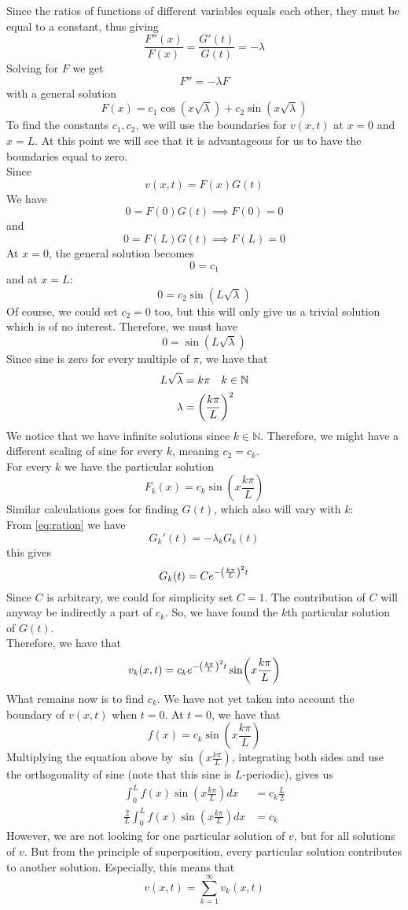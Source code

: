 \documentclass[12pt,english,a4paper]{article}
\begin{document}
Since the ratios of functions of different variables equals each other, they must be equal to a constant, thus giving
\[
\frac{F''(x)}{F(x)} = \frac{G'(t)}{G(t)} = -\lambda
\]
Solving for \(F\) we get
\[
	F'' = -\lambda F
\]
with a general solution
\[
F(x) = c_1\cos(x\sqrt{\lambda} ) + c_2\sin(x\sqrt{\lambda})
\]
To find the constants \(c_1,c_2\), we will use the boundaries for \(v(x,t)\) at \(x = 0\) and \(x = L\). At this point we will see that it is advantageous for us to have the boundaries equal to zero.\\
Since
\[
v(x,t) = F(x)G(t)
\]
We have
\[
0 = F(0)G(t) \implies F(0) = 0
\]
and
\[
0 = F(L)G(t) \implies F(L) = 0
\]
At \(x = 0\), the general solution becomes
\[
0 = c_1
\]
and at \(x = L\):
\[
0 =  c_2\sin(L\sqrt{\lambda})
\]
Of course, we could set \(c_2 = 0\) too, but this will only give us a trivial solution which is of no interest. Therefore, we must have
\[
0 = \sin(L\sqrt{\lambda})
\]
Since sine is zero for every multiple of \(\pi\), we have that
\begin{align*}
L\sqrt{\lambda} &= k\pi \quad k\in \mathbb{N}\\
\lambda &= \qty(\frac{k \pi}{L})^2
\end{align*}
We notice that we have infinite solutions since \(k \in \mathbb{N}\). Therefore, we might have a different scaling of sine for every \(k\), meaning \(c_2 = c_k\).\\  For every \(k\) we have the particular solution
\[
F_k(x) = c_k\sin(x\frac{k \pi}{L})
\]
Similar calculations goes for finding \(G(t)\), which also will vary with \(k\):\\
From \vref{eq:ration} we have
\[
G_k'(t) = -\lambda_k G_k(t)
\]
this gives
\[
G_k(t) = Ce^{-\qty(\frac{k \pi}{L})^2t}
\]
Since \(C\) is arbitrary, we could for simplicity set \( C = 1\). The contribution of \(C\) will anyway be indirectly a part of  \(c_k\). 
So, we have found the \(k\)th particular solution of \(G(t)\). \\
Therefore, we have that
\[
v_k(x,t) = c_ke^{-\qty(\frac{k \pi}{L})^2t}\sin(x\frac{k \pi}{L})
\]
What remains now is to find \(c_k\). We have not yet taken into account the boundary of \(v(x,t)\) when \(t = 0\). At \(t = 0\), we have that
\[
f(x) = c_k\sin(x\frac{k \pi}{L})
\]
Multiplying  the equation above by \(\sin(x\frac{k \pi}{L})\), integrating both sides and use the orthogonality of sine (note that this sine is \(L\)-periodic), gives us
\begin{align*}
\int_0^Lf(x)\sin(x\frac{k \pi}{L})dx &= c_k\frac{L}{2} \\
\frac{2}{L}\int_0^Lf(x)\sin(x\frac{k \pi}{L})dx &= c_k
\end{align*}
However, we are not looking for one particular solution of \(v\), but for all solutions of \(v\). But from the principle of superposition, every particular solution contributes to another solution. Especially, this means that
\[
v(x,t) = \sum_{k=1}^\infty v_k(x,t)
\]
\end{document}
